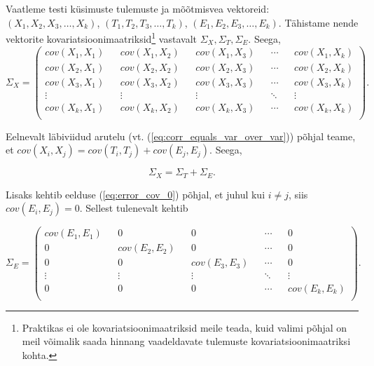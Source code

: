 \documentclass[a4paper,12pt,oneside]{article}
\numberwithin{equation}{section}
\theoremstyle{definition}
\begin{document}
Vaatleme testi k\"usimuste tulemuste ja mõõtmisvea vektoreid: $\left( X_1, X_2, X_3, \ldots, X_k \right)$, $\left( T_1, T_2, T_3, \ldots, T_k \right)$, $\left( E_1, E_2, E_3, \ldots, E_k \right)$. Tähistame nende vektorite kovariatsioonimaatriksid\footnote{Praktikas ei ole kovariatsioonimaatriksid meile teada, kuid valimi põhjal on meil võimalik saada hinnang vaadeldavate tulemuste kovariatsioonimaatriksi kohta.} vastavalt $\Sigma_X, \Sigma_T, \Sigma_E$. Seega, 
\small
\begin{equation*}
\Sigma_X = 
\begin{pmatrix}
cov \left(X_1,X_1 \right) && cov\left( X_1,X_2 \right) && cov \left( X_1,X_3 \right) && \cdots && cov \left( X_1,X_k \right) \\
cov \left(X_2, X_1 \right) && cov \left(X_2, X_2 \right) && cov \left(X_2, X_3 \right) && \cdots && cov \left(X_2, X_k \right) \\
cov \left(X_3, X_1 \right) && cov \left(X_3, X_2 \right) && cov \left(X_3, X_3 \right) && \cdots && cov \left(X_3, X_k \right) \\
\vdots && \vdots && \vdots && \ddots && \vdots \\
cov \left(X_k, X_1 \right) && cov \left(X_k, X_2 \right) && cov \left(X_k, X_3 \right) && \cdots && cov \left(X_k, X_k \right) \\
\end{pmatrix}.
\end{equation*}
\normalsize

Eelnevalt läbiviidud arutelu (vt. (\ref{eq:corr_equals_var_over_var})) põhjal teame, et $cov(X_i,X_j) = cov(T_i,T_j) + cov(E_j,E_j)$. Seega, 

\begin{equation}
\label{eq:sigma_x_=_sigma_t_+_sigma_e}
\Sigma_X = \Sigma_T + \Sigma_E \text{.}
\end{equation}

Lisaks kehtib eelduse (\ref{eq:error_cov_0}) põhjal, et juhul kui $i \neq j$, siis $cov \left( E_i, E_j \right) = 0$.
Sellest tulenevalt kehtib

\small
\begin{equation}
\label{eq:sigma_E}
\Sigma_E = 
\begin{pmatrix}
cov \left(E_1,E_1 \right) && 0 && 0 && \cdots && 0 \\
0 && cov \left(E_2, E_2 \right) && 0 && \cdots && 0 \\
0 && 0 && cov \left(E_3, E_3 \right) && \cdots && 0 \\
\vdots && \vdots && \vdots && \ddots && \vdots \\
0 && 0 &&  0 && \cdots && cov \left(E_k, E_k \right) \\
\end{pmatrix}.
\end{equation}
\normalsize
\end{document}
